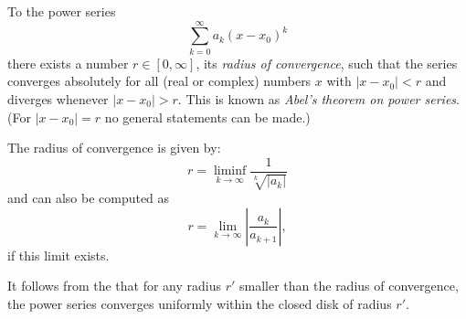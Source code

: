 \documentclass[12pt]{article}
\begin{document}
To the power series
\begin{equation}
\sum_{k=0}^{\infty}a_k(x-x_0)^k
\end{equation}
there exists a number $r\in [0,\infty]$, its \emph{radius of convergence}, such that the series converges absolutely for all (real or complex) numbers $x$ with $|x-x_0|<r$ and diverges whenever $|x-x_0|>r$. This is known as {\em Abel's theorem on power series}. (For $|x-x_0|= r$ no general statements can be made.)

The radius of convergence is given by:
\begin{equation}
r=\liminf_{k\to\infty}\frac{1}{\sqrt[k]{|a_k|}}
\end{equation}
and can also be computed as
\begin{equation}
r=\lim_{k\to\infty}\left|\frac{a_k}{a_{k+1}}\right|,
\end{equation}
if this limit exists.

It follows from the  that for any radius $r'$ smaller than the radius of convergence, the power series converges uniformly within the closed disk of radius $r'$.
\end{document}
